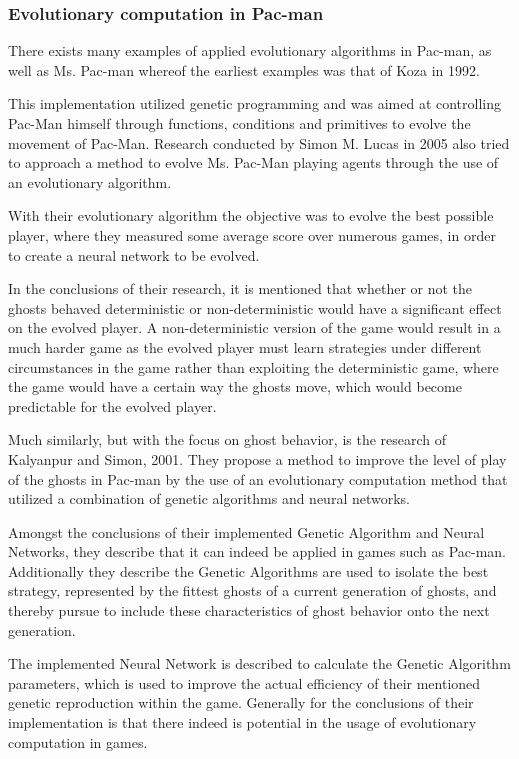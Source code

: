 \subsubsection{Evolutionary computation in Pac-man}


There exists many examples of applied evolutionary algorithms in Pac-man, as well as Ms. Pac-man whereof the earliest examples was that of Koza in 1992.\cite{Koza1992}

This implementation utilized genetic programming and was aimed at controlling Pac-Man himself through functions, conditions and primitives to evolve the movement of Pac-Man. \cite[pp. 2]{Lucas2005}
Research conducted by Simon M. Lucas in 2005 also tried to approach a method to evolve Ms. Pac-Man playing agents through the use of an evolutionary algorithm. \cite{Lucas2005}

With their evolutionary algorithm the objective was to evolve the best possible player, where they measured some average score over numerous games, in order to create a neural network to be evolved. \cite[pp. 8]{Lucas2005}

In the conclusions of their research, it is mentioned that whether or not the ghosts behaved deterministic or non-deterministic would have a significant effect on the evolved player. A non-deterministic version of the game would result in a much harder game  as the evolved player must learn strategies under different circumstances in the game rather than exploiting the deterministic game, where the game would have a certain way the ghosts move, which would become predictable for the evolved player.\cite[pp. 8]{Lucas2005}

Much similarly, but with the focus on ghost behavior, is the research of Kalyanpur and Simon, 2001. They propose a method to improve the level of play of the ghosts in Pac-man by the use of an evolutionary computation method that utilized a combination of genetic algorithms and neural networks. \cite{Kalyanpur2001}

Amongst the conclusions of their implemented Genetic Algorithm and Neural Networks, they describe that it can indeed be applied in games such as Pac-man. Additionally they describe the Genetic Algorithms are used to isolate the best strategy, represented by the fittest ghosts of a current generation of ghosts, and thereby pursue to include these characteristics of ghost behavior onto the next generation. \cite[pp. 8]{Kalyanpur2001}

The implemented Neural Network is described to calculate the Genetic Algorithm parameters, which is used to improve the actual efficiency of their mentioned genetic reproduction within the game. Generally for the conclusions of their implementation is that there indeed is potential in the usage of evolutionary computation in games.

